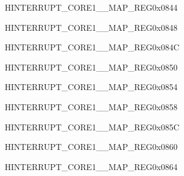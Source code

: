 \begin{register}{H}{INTERRUPT\_CORE1\_\_MAP\_REG}{0x0844}\label{regdesc:INTERRUPTCORE1GPIOINTERRUPTPRONMIMAPREG}
\end{register}
\vspace{-3em}

\begin{register}{H}{INTERRUPT\_CORE1\_\_MAP\_REG}{0x0848}\label{regdesc:INTERRUPTCORE1GPIOINTERRUPTAPPMAPREG}
\end{register}
\vspace{-3em}

\begin{register}{H}{INTERRUPT\_CORE1\_\_MAP\_REG}{0x084C}\label{regdesc:INTERRUPTCORE1GPIOINTERRUPTAPPNMIMAPREG}
\end{register}
\vspace{-3em}

\begin{register}{H}{INTERRUPT\_CORE1\_\_MAP\_REG}{0x0850}\label{regdesc:INTERRUPTCORE1SPIINTR1MAPREG}
\end{register}
\vspace{-3em}

\begin{register}{H}{INTERRUPT\_CORE1\_\_MAP\_REG}{0x0854}\label{regdesc:INTERRUPTCORE1SPIINTR2MAPREG}
\end{register}
\vspace{-3em}

\begin{register}{H}{INTERRUPT\_CORE1\_\_MAP\_REG}{0x0858}\label{regdesc:INTERRUPTCORE1SPIINTR3MAPREG}
\end{register}
\vspace{-3em}

\begin{register}{H}{INTERRUPT\_CORE1\_\_MAP\_REG}{0x085C}\label{regdesc:INTERRUPTCORE1SPIINTR4MAPREG}
\end{register}
\vspace{-3em}

\begin{register}{H}{INTERRUPT\_CORE1\_\_MAP\_REG}{0x0860}\label{regdesc:INTERRUPTCORE1LCDCAMINTMAPREG}
\end{register}
\vspace{-3em}

\begin{register}{H}{INTERRUPT\_CORE1\_\_MAP\_REG}{0x0864}\label{regdesc:INTERRUPTCORE1I2S0INTMAPREG}
\end{register}
\vspace{-3em}

